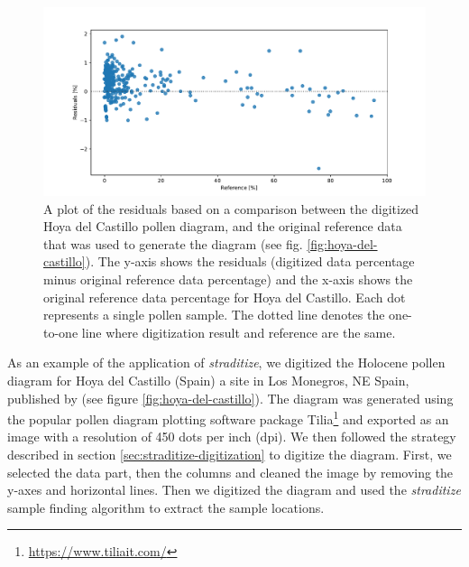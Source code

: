 \documentclass[
11pt, %
english, %
singlespacing, %
headsepline, %
]{MastersDoctoralThesis} %
\begin{document}
\begin{NoHyper}
\begin{refsection}
\begin{figure}
	\includegraphics[width=\linewidth]{straditize-figures/resid-plot-hoya-del-castillo.pdf}
	\caption[Residuals plot of the digitized Hoya del Castillo diagram]{A plot of the residuals based on a comparison between the digitized Hoya del Castillo pollen diagram, and the original reference data that was used to generate the diagram (see fig. \ref{fig:hoya-del-castillo}). The y-axis shows the residuals (digitized data percentage minus original reference data percentage) and the x-axis shows the original reference data percentage for Hoya del Castillo. Each dot represents a single pollen sample. The dotted line denotes the one-to-one line where digitization result and reference are the same.}
	\label{fig:hoya-resid}
\end{figure}

As an example of the application of \emph{straditize}, we digitized the Holocene pollen diagram for Hoya del Castillo (Spain) a site in Los Monegros, NE Spain, published by \cite{DavisStevenson2007} (see figure \ref{fig:hoya-del-castillo}). The diagram was generated using the popular pollen diagram plotting software package Tilia\footnote{\url{https://www.tiliait.com/}} \citep{Grimm1988, Grimm1991} and exported as an image with a resolution of 450 dots per inch (dpi). We then followed the strategy described in section \ref{sec:straditize-digitization} to digitize the diagram. First, we selected the data part, then the columns and cleaned the image by removing the y-axes and horizontal lines. Then we digitized the diagram and used the \emph{straditize} sample finding algorithm to extract the sample locations.  


\end{refsection}
\end{NoHyper}
\end{document}
